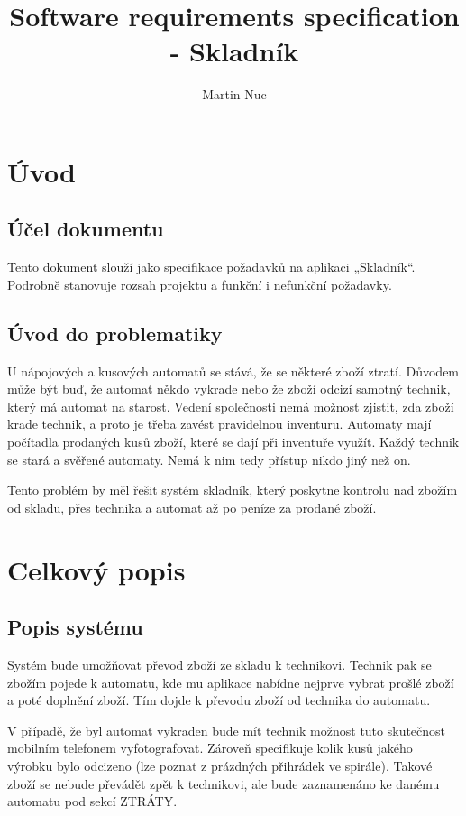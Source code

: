 \documentclass[a4paper,10pt]{article}
\title{Software requirements specification - Skladník}
\author{Martin Nuc}
\begin{document}
\maketitle

\tableofcontents
\section{Úvod}
\subsection{Účel dokumentu}
Tento dokument slouží jako specifikace požadavků na aplikaci „Skladník“. Podrobně stanovuje rozsah projektu a funkční i nefunkční požadavky.

\subsection{Úvod do problematiky}
U nápojových a kusových automatů se stává, že se některé zboží ztratí. Důvodem může být buď, že automat někdo vykrade nebo že zboží odcizí samotný technik, který má automat na starost. Vedení společnosti nemá možnost zjistit, zda zboží krade technik, a proto je třeba zavést pravidelnou inventuru. Automaty mají počítadla prodaných kusů zboží, které se dají při inventuře využít. Každý technik se stará a svěřené automaty. Nemá k nim tedy přístup nikdo jiný než on.

Tento problém by měl řešit systém skladník, který poskytne kontrolu nad zbožím od skladu, přes technika a automat až po peníze za prodané zboží.

\section{Celkový popis}
\subsection{Popis systému}
Systém bude umožňovat převod zboží ze skladu k technikovi. Technik pak se zbožím pojede k automatu, kde mu aplikace nabídne nejprve vybrat prošlé zboží a poté doplnění zboží. Tím dojde k převodu zboží od technika do automatu.

V případě, že byl automat vykraden bude mít technik možnost tuto skutečnost mobilním telefonem vyfotografovat. Zároveň specifikuje kolik kusů jakého výrobku bylo odcizeno (lze poznat z prázdných přihrádek ve spirále). Takové zboží se nebude převádět zpět k technikovi, ale bude zaznamenáno ke danému automatu pod sekcí ZTRÁTY.
\end{document}
